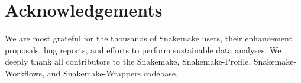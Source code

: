 \documentclass[parskip=half]{scrartcl}
\begin{document}
\section{Acknowledgements}
We are most grateful for the thousands of Snakemake users, their enhancement proposals, bug reports, and efforts to perform sustainable data analyses.
We deeply thank all contributors to the Snakemake, Snakemake-Profile, Snakemake-Workflows, and Snakemake-Wrappers codebase.

\printbibliography
\end{document}
